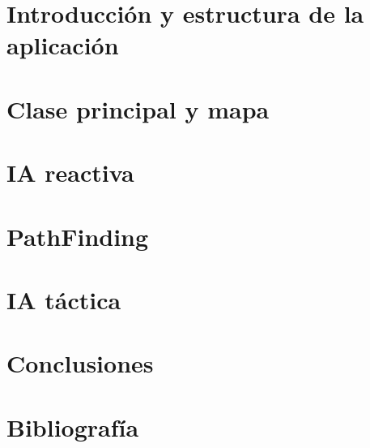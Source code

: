 \documentclass[a4paper,10pt]{article}
\begin{document}
\part{Introducción y estructura de la aplicación}





\part{Clase principal y mapa}





\part{IA reactiva}









\part{PathFinding}



\part{IA táctica}


\part{Conclusiones}



\newpage
\part{Bibliografía}

\end{document}

